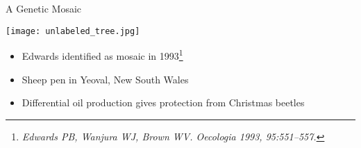 \documentclass{beamer}
\begin{document}






\begin{frame}{A Genetic Mosaic}
	\begin{center}
	\texttt{[image: unlabeled\_tree.jpg]}
	\end{center}
	\begin{itemize}
		\item Edwards identified as mosaic in 1993\footnote{\textit{Edwards PB, Wanjura WJ, Brown WV. Oecologia 1993, 95:551–557.}}
		\item Sheep pen in Yeoval, New South Wales
		\item Differential oil production gives protection from Christmas beetles
	\end{itemize}
\end{frame}
\end{document}
